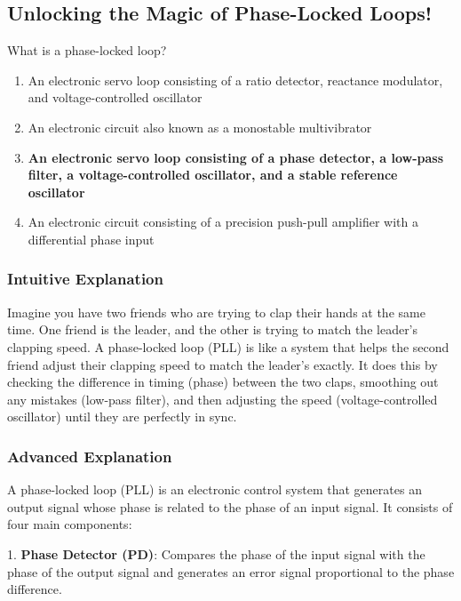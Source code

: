 \subsection{Unlocking the Magic of Phase-Locked Loops!}

\begin{tcolorbox}[colback=gray!10!white,colframe=black!75!black,title=E7H03] What is a phase-locked loop?
    \begin{enumerate}[label=\Alph*.]
        \item An electronic servo loop consisting of a ratio detector, reactance modulator, and voltage-controlled oscillator
        \item An electronic circuit also known as a monostable multivibrator
        \item \textbf{An electronic servo loop consisting of a phase detector, a low-pass filter, a voltage-controlled oscillator, and a stable reference oscillator}
        \item An electronic circuit consisting of a precision push-pull amplifier with a differential phase input
    \end{enumerate}
\end{tcolorbox}

\subsubsection{Intuitive Explanation}
Imagine you have two friends who are trying to clap their hands at the same time. One friend is the leader, and the other is trying to match the leader's clapping speed. A phase-locked loop (PLL) is like a system that helps the second friend adjust their clapping speed to match the leader's exactly. It does this by checking the difference in timing (phase) between the two claps, smoothing out any mistakes (low-pass filter), and then adjusting the speed (voltage-controlled oscillator) until they are perfectly in sync.

\subsubsection{Advanced Explanation}
A phase-locked loop (PLL) is an electronic control system that generates an output signal whose phase is related to the phase of an input signal. It consists of four main components:

1. \textbf{Phase Detector (PD)}: Compares the phase of the input signal with the phase of the output signal and generates an error signal proportional to the phase difference.

